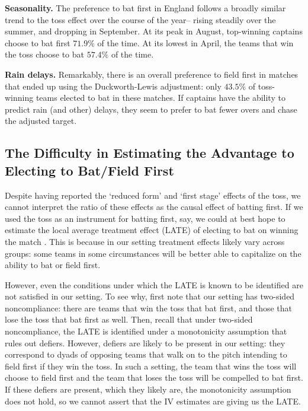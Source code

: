 \documentclass[11pt,  letterpaper]{article}
\begin{document}
\textbf{Seasonality.} The preference to bat first in England follows a broadly similar trend to the toss effect over the course of the year-- rising steadily over the summer, and dropping in September. At its peak in August, top-winning captains choose to bat first $71.9\%$ of the time. At its lowest in April, the  teams that win the toss choose to bat $57.4\%$ of the time.

\textbf{Rain delays.} Remarkably, there is an overall preference to field first in matches that ended up using the Duckworth-Lewis adjustment: only $43.5\%$ of toss-winning teams elected to bat in these matches. If captains have the ability to predict rain (and other) delays, they seem to prefer to bat fewer overs and chase the adjusted target.

\subsection{The Difficulty in Estimating the Advantage to Electing to Bat/Field First}

Despite having reported the `reduced form' and `first stage' effects of the toss, we cannot interpret the ratio of these effects as the causal effect of batting first. If we used the toss as an instrument for batting first, say, we could at best hope to estimate the local average treatment effect (LATE) of electing to bat on winning the match \citep{angrist1996identification}. This is because in our setting treatment effects likely vary across groups: some teams in some circumstances will be better able to capitalize on the ability to bat or field first.  

However, even the conditions under which the LATE is known to be identified are not satisfied in our setting. To see why, first note that our setting has two-sided noncompliance: there are teams that win the toss that bat first, and those that lose the toss that bat first as well. Then, recall that under two-sided noncompliance, the LATE is identified under a monotonicity assumption that rules out defiers. However, defiers are likely to be present in our setting: they correspond to dyads of opposing teams that walk on to the pitch intending to field first if they win the toss. In such a setting, the team that wins the toss will choose to field first and the team that loses the toss will be compelled to bat first. If these defiers are present, which they likely are, the monotonicity assumption does not hold, so we cannot assert that the IV estimates are giving us the LATE.
\end{document}

